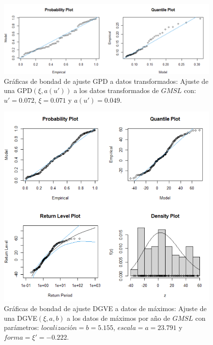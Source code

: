 \documentclass[10.5pt,notitlepage]{article}
\theoremstyle{plain}
\begin{document}
\begin{figure}[htb]
    \centering
    \includegraphics[scale = 0.4]{Incisob/AP1trans.png}
    \caption{Gráficas de bondad de ajuste GPD a datos transformados: Ajuste de una GPD\((\xi,a(u'))\) a los datos transformados de \(GMSL\) con: \(u' = 0.072\), \(\xi = 0.071\) y \(a(u') = 0.049\).}
    \label{fig:7}   
\end{figure}

\begin{figure}[htb]
    \centering
    \includegraphics[scale = 0.4]{Incisob/gevfitgmsl.png}
    \caption{Gráficas de bondad de ajuste DGVE a datos de máximos: Ajuste de una DGVE\((\xi,a,b)\) a los datos de máximos por año de \(GMSL\) con parámetros: \(localización=b = 5.155\), \(escala =a = 23.791\) y \(forma = \xi'= -0.222\).}
    \label{fig:7.1}   
\end{figure}
\end{document}
